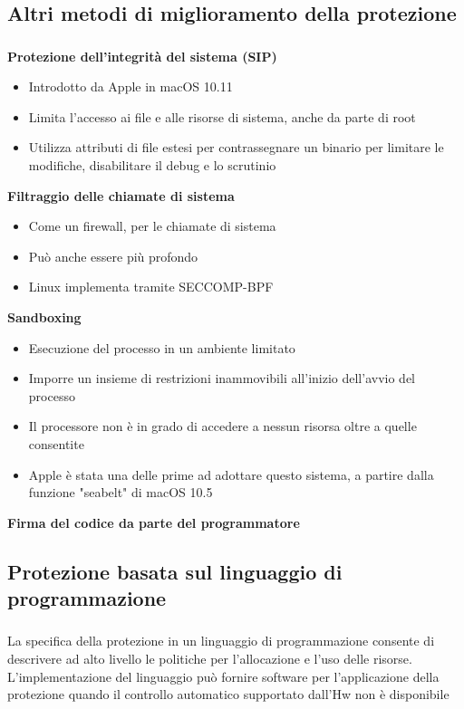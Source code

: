 \documentclass{beamer}
\newenvironment{mainframe}{
	\begin{frame}
		\frametitle{\insertsubsection}
		\framesubtitle{\insertsection}
	}{
	\end{frame}
}
\begin{document}
\subsection{Altri metodi di miglioramento della protezione}
\begin{mainframe}
{\tiny 	\textbf{Protezione dell'integrità del sistema (SIP)}
	\begin{itemize}
		\item Introdotto da Apple in macOS 10.11
		\item Limita l'accesso ai file e alle risorse di sistema, anche da parte di root
		\item Utilizza attributi di file estesi per contrassegnare un binario per limitare le modifiche, disabilitare il debug e lo scrutinio
	\end{itemize}
	\textbf{Filtraggio delle chiamate di sistema}
	\begin{itemize}
		\item Come un firewall, per le chiamate di sistema
		\item Può anche essere più profondo
		\item Linux implementa tramite SECCOMP-BPF
	\end{itemize}
	\textbf{Sandboxing}
	\begin{itemize}
		\item Esecuzione del processo in un ambiente limitato
		\item Imporre un insieme di restrizioni inammovibili all'inizio dell'avvio del processo
		\item Il processore non è in grado di accedere a nessun risorsa oltre a quelle consentite
		\item Apple è stata una delle prime ad adottare questo sistema, a partire dalla funzione "seabelt" di macOS 10.5
	\end{itemize}
	\textbf{Firma del codice da parte del programmatore}}
\end{mainframe}
\subsection{Protezione basata sul linguaggio di programmazione}
\begin{mainframe}
	La specifica della protezione in un linguaggio di programmazione consente di descrivere ad alto livello le politiche per l'allocazione e l'uso delle risorse.\\
	L'implementazione del linguaggio può fornire software per l'applicazione della protezione quando il controllo automatico supportato dall'Hw non è disponibile
\end{mainframe}
\end{document}
